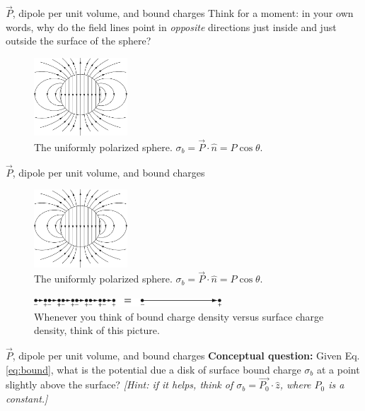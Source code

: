 \documentclass{beamer}
\begin{document}
\begin{frame}{$\vec{P}$, dipole per unit volume, and bound charges}
\small
Think for a moment: in your own words, why do the field lines point in \textit{opposite} directions just inside and just outside the surface of the sphere?
\begin{figure}
\centering
\includegraphics[width=3.5cm]{figures/4_10.jpg}
\caption{\label{fig:sigma2} The uniformly polarized sphere. $\sigma_b = \vec{P} \cdot \hat{n} = P\cos\theta$.}
\end{figure}
\end{frame}

\begin{frame}{$\vec{P}$, dipole per unit volume, and bound charges}
\begin{figure}
\centering
\includegraphics[width=3.5cm]{figures/4_10.jpg}
\caption{\label{fig:sigma3} The uniformly polarized sphere. $\sigma_b = \vec{P} \cdot \hat{n} = P\cos\theta$.}
\end{figure}
\begin{figure}
\centering
\includegraphics[width=7cm]{figures/4_11.jpg}
\caption{\label{fig:sigma4} Whenever you think of bound charge density versus surface charge density, think of this picture.}
\end{figure}
\end{frame}

\begin{frame}{$\vec{P}$, dipole per unit volume, and bound charges}
\textbf{Conceptual question:} Given Eq. \ref{eq:bound}, what is the potential due a disk of surface bound charge $\sigma_b$ at a point slightly above the surface? \textit{[Hint: if it helps, think of $\sigma_b = \vec{P_0} \cdot \hat{z}$, where $P_0$ is a constant.]}\\ \vspace{6cm}
\end{frame}
\end{document}
